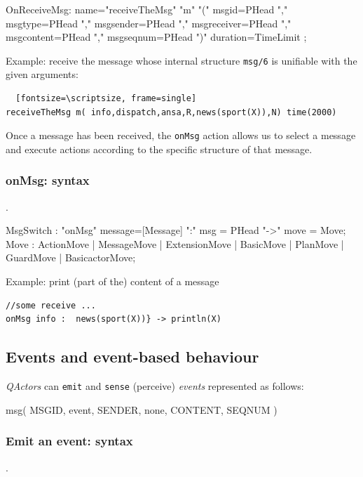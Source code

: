 \begin{javacode}  
OnReceiveMsg: name="receiveTheMsg" "m" "(" msgid=PHead ","   msgtype=PHead "," msgsender=PHead 
 	"," msgreceiver=PHead "," msgcontent=PHead "," msgseqnum=PHead ")" duration=TimeLimit  ;
\end{javacode}

\noindent Example: receive the message whose internal structure \texttt{msg/6} is unifiable with the given arguments:
\begin{Verbatim}  [fontsize=\scriptsize, frame=single]
receiveTheMsg m( info,dispatch,ansa,R,news(sport(X)),N) time(2000) 
\end{Verbatim}

Once a message has been received, the \texttt{onMsg} action allows us to select a message and execute actions according to the specific structure of that message. 

\subsubsection{onMsg: syntax}.
\begin{javacode}  
MsgSwitch : "onMsg" message=[Message]   ":" msg = PHead "->" move = Move;
Move      : ActionMove | MessageMove | ExtensionMove  | BasicMove | PlanMove | GuardMove | BasicactorMove;
\end{javacode}

\noindent Example: print (part of the) content of a message 
\begin{Verbatim}[fontsize=\scriptsize, frame=single]
//some receive ...
onMsg info :  news(sport(X))} -> println(X)
\end{Verbatim}
 


 
\subsection{Events and event-based behaviour } 


\textit{QActors} can \texttt{emit} and \texttt{sense} (perceive) \textit{events	} represented as follows:

\begin{qacode}
msg( MSGID, event, SENDER, none, CONTENT, SEQNUM )
\end{qacode}

 
\subsubsection{Emit an event: syntax}.

